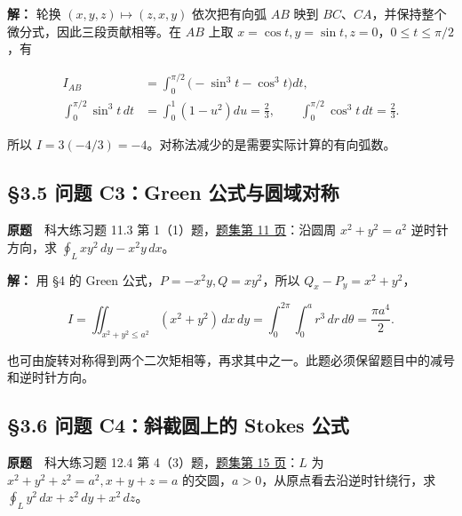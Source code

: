 \documentclass[11pt,a4paper]{article}
\begin{document}
\textbf{解：} 轮换 \((x,y,z)\mapsto(z,x,y)\) 依次把有向弧 \(AB\) 映到
\(BC\)、\(CA\)，并保持整个微分式，因此三段贡献相等。在 \(AB\) 上取
\(x=\cos t,y=\sin t,z=0\)，\(0\le t\le\pi/2\)，有

\begin{equation*}
\begin{aligned}
 I_{AB}
 &=\int_0^{\pi/2}\bigl(-\sin^3t-\cos^3t\bigr)dt,\\
 \int_0^{\pi/2}\sin^3t\,dt
 &=\int_0^1(1-u^2)du=\frac23,
 \qquad \int_0^{\pi/2}\cos^3t\,dt=\frac23.
\end{aligned}
\end{equation*}

所以 \(I=3(-4/3)=-4\)。对称法减少的是需要实际计算的有向弧数。

\subsection{§3.5 问题 C3：Green
公式与圆域对称}\label{ux95eeux9898-c3green-ux516cux5f0fux4e0eux5706ux57dfux5bf9ux79f0}

\textbf{原题}　科大练习题 11.3 第
1（1）题，\href{https://zj139.github.io/math-notes/files/problems/科大数分习题-v2\%282\%29.pdf\#page=11}{题集第
11 页}：沿圆周 \(x^2+y^2=a^2\) 逆时针方向，求
\(\oint_Lxy^2\,dy-x^2y\,dx\)。

\textbf{解：} 用 §4 的 Green 公式，\(P=-x^2y,Q=xy^2\)，所以
\(Q_x-P_y=x^2+y^2\)，

\begin{equation*}
 I=\iint_{x^2+y^2\le a^2}(x^2+y^2)\,dx\,dy
 =\int_0^{2\pi}\!\int_0^a r^3\,dr\,d\theta
 =\frac{\pi a^4}{2}.
\end{equation*}

也可由旋转对称得到两个二次矩相等，再求其中之一。此题必须保留题目中的减号和逆时针方向。

\subsection{§3.6 问题 C4：斜截圆上的 Stokes
公式}\label{ux95eeux9898-c4ux659cux622aux5706ux4e0aux7684-stokes-ux516cux5f0f}

\textbf{原题}　科大练习题 12.4 第
4（3）题，\href{https://zj139.github.io/math-notes/files/problems/科大数分习题-v2\%282\%29.pdf\#page=15}{题集第
15 页}：\(L\) 为 \(x^2+y^2+z^2=a^2,x+y+z=a\)
的交圆，\(a>0\)，从原点看去沿逆时针绕行，求
\(\oint_Ly^2\,dx+z^2\,dy+x^2\,dz\)。
\end{document}
